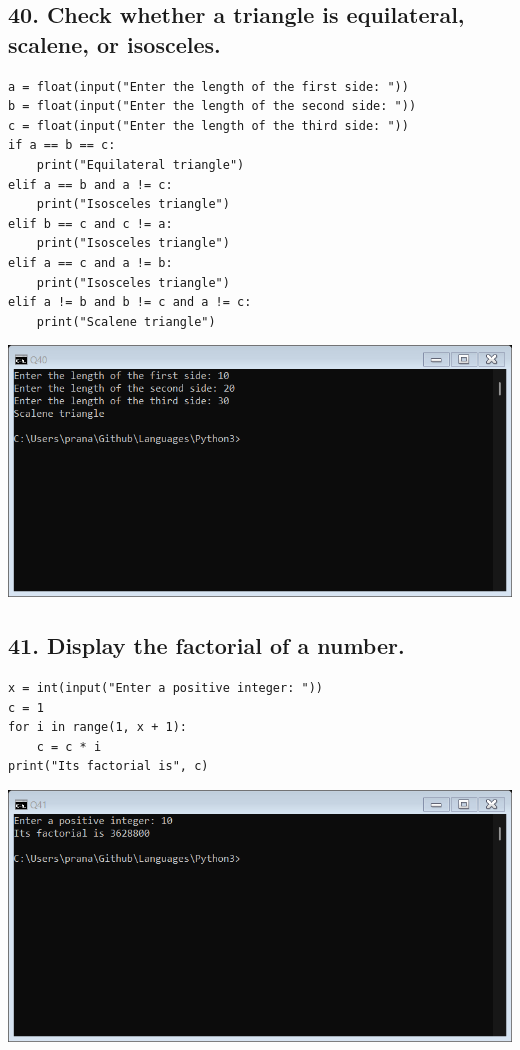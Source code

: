 \documentclass[12pt]{article}
\begin{document}
\subsection*{40. Check whether a triangle is equilateral, scalene, or isosceles.}
\begin{verbatim}
a = float(input("Enter the length of the first side: "))
b = float(input("Enter the length of the second side: "))
c = float(input("Enter the length of the third side: "))
if a == b == c:
    print("Equilateral triangle")
elif a == b and a != c:
    print("Isosceles triangle")
elif b == c and c != a:
    print("Isosceles triangle")
elif a == c and a != b:
    print("Isosceles triangle")
elif a != b and b != c and a != c:
    print("Scalene triangle")
\end{verbatim}
\includegraphics[width=\linewidth]{images/40.png}

\subsection*{41. Display the factorial of a number.}
\begin{verbatim}
x = int(input("Enter a positive integer: "))
c = 1
for i in range(1, x + 1):
    c = c * i
print("Its factorial is", c)
\end{verbatim}
\includegraphics[width=\linewidth]{images/41.png}
\end{document}
